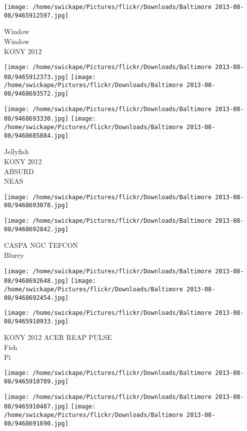 \documentclass[10pt,letterpaper]{article}
\begin{document}
\vspace{0.25in}
\texttt{[image: /home/swickape/Pictures/flickr/Downloads/Baltimore 2013-08-08/9465912597.jpg]}

Window\\
Window\\
KONY 2012\\
\pagebreak

\texttt{[image: /home/swickape/Pictures/flickr/Downloads/Baltimore 2013-08-08/9465912373.jpg]}
\texttt{[image: /home/swickape/Pictures/flickr/Downloads/Baltimore 2013-08-08/9468693572.jpg]}

\texttt{[image: /home/swickape/Pictures/flickr/Downloads/Baltimore 2013-08-08/9468693330.jpg]}
\texttt{[image: /home/swickape/Pictures/flickr/Downloads/Baltimore 2013-08-08/9468685884.jpg]}

Jellyfish\\
KONY 2012\\
ABSURD\\
NEAS\\
\pagebreak

\texttt{[image: /home/swickape/Pictures/flickr/Downloads/Baltimore 2013-08-08/9468693078.jpg]}

\vspace{0.25in}
\texttt{[image: /home/swickape/Pictures/flickr/Downloads/Baltimore 2013-08-08/9468692842.jpg]}

CASPA NGC TEFCON\\
Blurry\\
\pagebreak

\texttt{[image: /home/swickape/Pictures/flickr/Downloads/Baltimore 2013-08-08/9468692648.jpg]}
\texttt{[image: /home/swickape/Pictures/flickr/Downloads/Baltimore 2013-08-08/9468692454.jpg]}

\vspace{0.25in}
\texttt{[image: /home/swickape/Pictures/flickr/Downloads/Baltimore 2013-08-08/9465910933.jpg]}

KONY 2012 ACER REAP PULSE\\
Fish\\
Pi\\
\pagebreak

\texttt{[image: /home/swickape/Pictures/flickr/Downloads/Baltimore 2013-08-08/9465910709.jpg]}

\vspace{0.25in}
\texttt{[image: /home/swickape/Pictures/flickr/Downloads/Baltimore 2013-08-08/9465910487.jpg]}
\texttt{[image: /home/swickape/Pictures/flickr/Downloads/Baltimore 2013-08-08/9468691690.jpg]}
\end{document}
